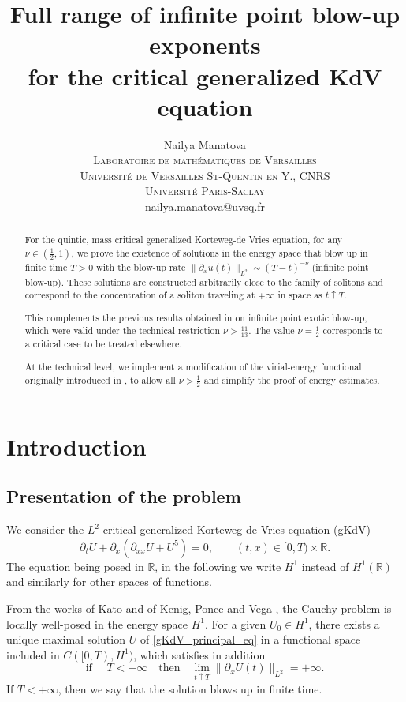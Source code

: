 \documentclass[16pt,english, oneside,reqno]{smfart}
\title{Full range of infinite point blow-up exponents \\ for the critical generalized KdV equation}
\author{Nailya Manatova
\\ \textsc{Laboratoire de mathématiques de Versailles}
\\ \textsc{Université de Versailles St-Quentin en Y., CNRS}
\\ \textsc{Université Paris-Saclay}
\\ nailya.manatova@uvsq.fr}
\newcommand{\RR}{\mathbb{R}}
\begin{document}
\begin{abstract}
   For the quintic, mass critical generalized Korteweg-de Vries equation, for any $\nu \in (\frac 12, 1)$, we prove the existence of  solutions in the energy space that blow up in finite time $T>0$ with the blow-up rate
   $\|\partial_x u(t)\|_{L^2} \sim (T-t)^{-\nu}$ (infinite point blow-up). 
   These solutions are constructed arbitrarily close to the family of solitons and correspond to
   the concentration of a soliton traveling at $+\infty$ in space as $t\uparrow T$.

   This complements the previous results obtained in \cite{MMPIII} on infinite point exotic blow-up,
   which were valid under the technical restriction $\nu>\frac {11}{13}$.
   The value $\nu=\frac 12$ corresponds to a critical case to be treated elsewhere.
   
   At the technical level, we implement a modification of the virial-energy functional originally introduced in \cite{MMPI,MMPIII}, to allow all $\nu > \frac 12$ and simplify the proof of energy estimates.
\end{abstract}


\maketitle


\section{Introduction}

\subsection{Presentation of the problem}
We consider the $L^2$ critical generalized Korteweg-de Vries equation (gKdV)
\begin{equation}\label{gKdV_principal_eq}
    \partial_t U + \partial_x(\partial_{xx}U + U^5)=0, \qquad (t,x)\in [0,T) \times\RR.
\end{equation}
The equation being posed in $\RR$, in the following we write $H^1$ instead of $H^1(\RR)$
and similarly for other spaces of functions.

From the works of Kato \cite{Kato-1983} and of Kenig, Ponce and Vega \cite{KPV93}, the Cauchy problem is locally well-posed in the energy space $H^1$. For a given $U_0 \in H^1$, there exists a unique maximal solution $U$ of \eqref{gKdV_principal_eq} in a functional space included in $C([0,T), H^1)$, which satisfies in addition
\begin{equation}
    \text{if }\quad T < +\infty \quad \text{then} \quad \lim_{t \uparrow T} \|\partial_x U(t)\|_{L^2} = + \infty.
\end{equation}
If $T<+\infty$, then we say that the solution blows up in finite time.
\end{document}
